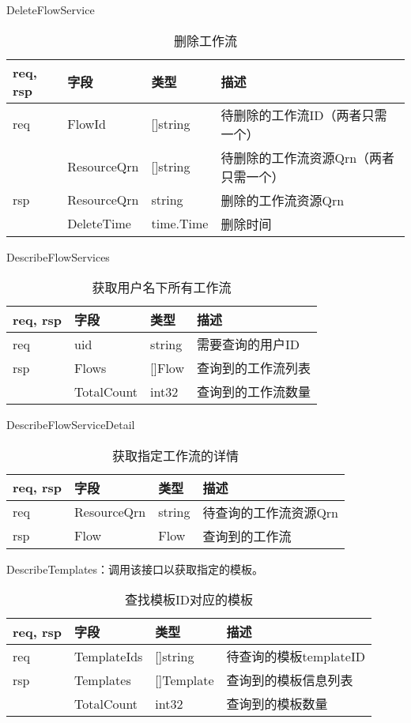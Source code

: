 DeleteFlowService
\begin{table}[H]
    \centering
    \caption{删除工作流}
    \label{tab:design-interface-flow-delete}
    \begin{tabular}{llll}
        \toprule
        req, rsp   & 字段 & 类型 & 描述 \\
        \midrule
        req & FlowId & []string & 待删除的工作流ID（两者只需一个） \\
        & ResourceQrn & []string & 待删除的工作流资源Qrn（两者只需一个） \\ \hline
        rsp & ResourceQrn & string & 删除的工作流资源Qrn \\
        & DeleteTime & time.Time & 删除时间 \\
        \bottomrule
    \end{tabular}
\end{table}
DescribeFlowServices
\begin{table}[H]
    \centering
    \caption{获取用户名下所有工作流}
    \label{tab:design-interface-flow-services}
    \begin{tabular}{llll}
        \toprule
        req, rsp   & 字段 & 类型 & 描述 \\
        \midrule
        req & uid & string & 需要查询的用户ID \\ \hline
        rsp & Flows & []Flow & 查询到的工作流列表 \\
        & TotalCount & int32 & 查询到的工作流数量 \\
        \bottomrule
    \end{tabular}
\end{table}

DescribeFlowServiceDetail
\begin{table}[H]
    \centering
    \caption{获取指定工作流的详情}
    \label{tab:design-interface-flow-detail}
    \begin{tabular}{llll}
        \toprule
        req, rsp   & 字段 & 类型 & 描述 \\
        \midrule
        req & ResourceQrn & string & 待查询的工作流资源Qrn \\ \hline
        rsp & Flow & Flow & 查询到的工作流 \\
        \bottomrule
    \end{tabular}
\end{table}


DescribeTemplates：调用该接口以获取指定的模板。
\begin{table}[H]
    \centering
    \caption{查找模板ID对应的模板}
    \label{tab:design-interface-template}
    \begin{tabular}{llll}
        \toprule
        req, rsp   & 字段 & 类型 & 描述 \\
        \midrule
        req & TemplateIds & []string & 待查询的模板templateID \\ \hline
        rsp & Templates & []Template & 查询到的模板信息列表 \\
        & TotalCount & int32 & 查询到的模板数量 \\
        \bottomrule
    \end{tabular}
\end{table}


